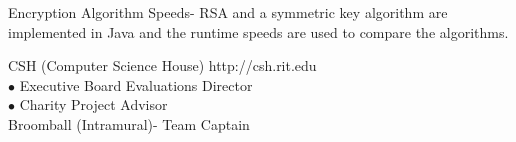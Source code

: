 \documentclass[10pt]{article} %
\begin{document}
	\noindent Encryption Algorithm Speeds- RSA and a symmetric key algorithm are implemented in Java and the runtime speeds are used to compare the algorithms.
	

\bigskip


	\newline
		CSH (Computer Science House)	\hfill http://csh.rit.edu\\
			\indent $\bullet$ Executive Board Evaluations Director\\
			\indent $\bullet$ Charity Project Advisor\\
		Broomball (Intramural)- Team Captain
	
\end{document}
